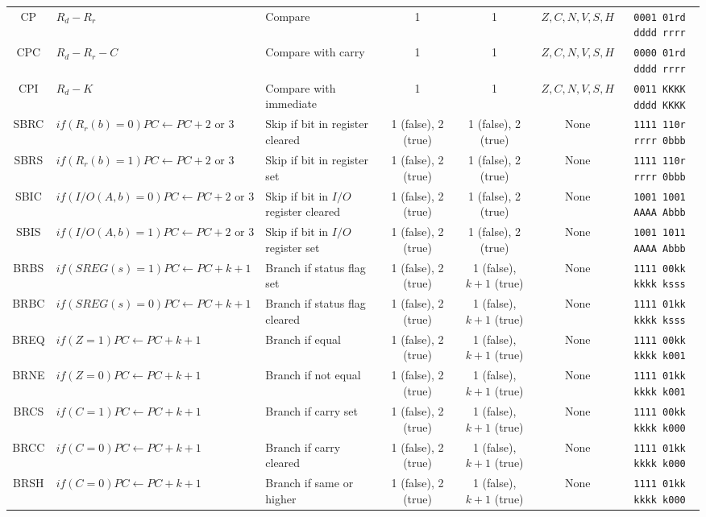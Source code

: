 \documentclass[11pt]{article}
\begin{document}
\begin{center}
\begin{longtable}{|c|m{10em}|l|c|c|c|c|}
CP & $R_d - R_r$ & Compare & 1 & 1 & $Z, C, N, V, S, H$ & \texttt{0001 01rd dddd rrrr}\\
CPC & $ R_d - R_r - C$ & Compare with carry & 1 & 1 & $Z, C, N, V, S, H$ & \texttt{0000 01rd dddd rrrr}\\
CPI & $R_d - K$ & Compare with immediate & 1 & 1 & $Z, C, N, V, S, H$ & \texttt{0011 KKKK dddd KKKK}\\
SBRC & $if(R_r(b) = 0) PC \leftarrow PC + 2 \text{ or } 3$ & Skip if bit in register cleared & 1 (false), 2 (true) & 1 (false), 2 (true) & None & \texttt{1111 110r rrrr 0bbb}\\
SBRS & $if(R_r(b) = 1) PC \leftarrow PC + 2 \text{ or } 3$ & Skip if bit in register set & 1 (false), 2 (true) & 1 (false), 2 (true) & None & \texttt{1111 110r rrrr 0bbb}\\
SBIC & $if(I/O(A, b) = 0) PC \leftarrow PC + 2 \text{ or } 3$ & Skip if bit in $I/O$ register cleared & 1 (false), 2 (true) & 1 (false), 2 (true) & None & \texttt{1001 1001 AAAA Abbb}\\
SBIS & $if(I/O(A, b) = 1) PC \leftarrow PC +2 \text{ or } 3$ & Skip if bit in $I/O$ register set & 1 (false), 2 (true) & 1 (false), 2 (true) & None & \texttt{1001 1011 AAAA Abbb}\\
BRBS & $if(SREG(s) = 1) PC \leftarrow PC + k + 1$ & Branch if status flag set & 1 (false), 2 (true) & 1 (false), $k + 1$ (true) & None & \texttt{1111 00kk kkkk ksss}\\
BRBC & $if(SREG(s) = 0) PC \leftarrow PC + k + 1$ & Branch if status flag cleared & 1 (false), 2 (true) & 1 (false), $k+1$ (true) & None & \texttt{1111 01kk kkkk ksss}\\
BREQ & $if(Z = 1) PC \leftarrow PC + k + 1$ & Branch if equal & 1 (false), 2 (true) & 1 (false), $k+1$ (true) & None & \texttt{1111 00kk kkkk k001}\\
BRNE & $if(Z = 0) PC \leftarrow PC + k + 1$ & Branch if not equal & 1 (false), 2 (true) & 1 (false), $k+1$ (true) & None & \texttt{1111 01kk kkkk k001}\\
BRCS & $if(C = 1) PC \leftarrow PC + k + 1$ & Branch if carry set & 1 (false), 2 (true) & 1 (false), $k+1$ (true) & None & \texttt{1111 00kk kkkk k000}\\
BRCC & $if(C = 0) PC \leftarrow PC + k + 1$ & Branch if carry cleared & 1 (false), 2 (true) & 1 (false), $k+1$ (true) & None & \texttt{1111 01kk kkkk k000}\\
BRSH & $if(C = 0) PC \leftarrow PC + k + 1$ & Branch if same or higher & 1 (false), 2 (true) & 1 (false), $k+1$ (true) & None & \texttt{1111 01kk kkkk k000}\\

\end{longtable}
\end{center}
\end{document}
